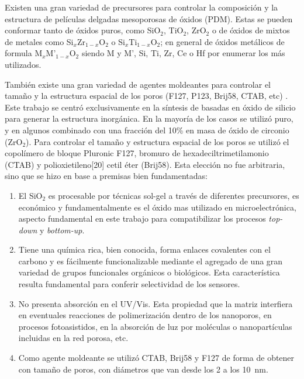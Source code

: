 	Existen una gran variedad de precursores para controlar la composición y la estructura de películas delgadas mesoporosas de óxidos (PDM). Estas se pueden conformar tanto de óxidos puros, como SiO$_2$, TiO$_2$, ZrO$_2$ o de óxidos de mixtos de metales como Si$_x$Zr$_{1-x}$O$_2$ o Si$_x$Ti$_{1-x}$O$_2$; en general de óxidos metálicos de formula M$_{x}$M'$_{1-x}$O$_2$ siendo M y M', Si, Ti, Zr, Ce o Hf por enumerar los más utilizados.

	También existe una gran variedad de agentes moldeantes para controlar el tamaño y la estructura espacial de los poros (F127, P123, Brij58, CTAB, etc) \cite{angelome2011,schuth2013,Soler-Illia2006,Soler-Illia2002a}. Este trabajo se centró exclusivamente en la síntesis de \pdm\space basadas en óxido de silicio para generar la estructura inorgánica. En la mayoría de los casos se utilizó puro, y en algunos combinado con una fracción del 10\% en masa de óxido de circonio (ZrO$_2$). Para controlar el tamaño y estructura espacial de los poros se utilizó el copolímero de bloque Pluronic F127, bromuro de hexadeciltrimetilamonio (CTAB) y polioxietileno[20] cetil éter (Brij58). Esta elección no fue arbitraria, sino que se hizo en base a premisas bien fundamentadas:
		
		\begin{enumerate}

		\item El SiO$_2$ es procesable por técnicas sol-gel a través de diferentes precursores, es económico y fundamentalmente es el óxido mas utilizado en microelectrónica, aspecto fundamental en este trabajo para compatibilizar los procesos \textit{top-down} y \textit{bottom-up}.

		\item Tiene una química rica, bien conocida, forma enlaces covalentes con el carbono y es fácilmente funcionalizable mediante el agregado de una gran variedad de grupos funcionales orgánicos o biológicos. Esta característica resulta fundamental para conferir selectividad de los sensores.

		\item No presenta absorción en el UV/Vis. Esta propiedad que la matriz interfiera en eventuales reacciones de polimerización dentro de los nanoporos, en procesos fotoasistidos, en la absorción de luz por moléculas o nanopartículas incluidas en la red porosa, etc. 

		\item Como agente moldeante se utilizó CTAB, Brij58 y F127  de forma de obtener \pdm\space con tamaño de poros, con diámetros que van desde los 2 a los \SI{10}{\nm}.

		\end{enumerate}
	
